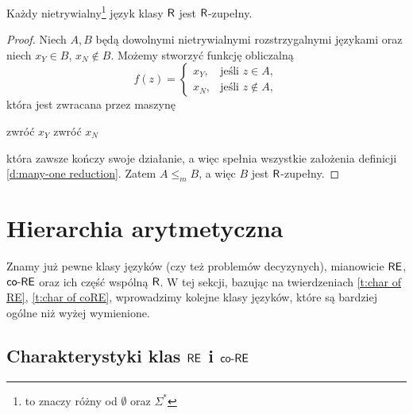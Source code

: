 \begin{theorem}
    Każdy nietrywialny\footnote{to znaczy różny od $\emptyset$ oraz $\Sigma^*$} język klasy $\textsf{R}$ jest $\textsf{R}$-zupełny.
\end{theorem}
\begin{proof}
    Niech $A, B$ będą dowolnymi nietrywialnymi rozstrzygalnymi językami oraz niech $x_Y \in B$, $x_N \notin B$. Możemy stworzyć funkcję obliczalną
    \[ f(z) =
        \begin{cases}
            x_Y, & \text{jeśli } z \in A, \\
            x_N, & \text{jeśli } z \notin A,
        \end{cases}
    \]
    która jest zwracana przez maszynę
    \begin{algorithmic}
            \State zwróć $x_Y$
        \Else
            \State zwróć $x_N$
        \EndIf
    \end{algorithmic}
    która zawsze kończy swoje działanie, a więc spełnia wszystkie założenia definicji \ref{d:many-one reduction}. Zatem $A \leq_m B$, a więc $B$ jest $\textsf{R}$-zupełny.
\end{proof}



\section{Hierarchia arytmetyczna}
Znamy już pewne klasy języków (czy też problemów decyzynych), mianowicie $\textsf{RE}$, $\textsf{co-RE}$ oraz ich część wspólną $\textsf{R}$. W tej sekcji, bazując na twierdzeniach \ref{t:char of RE}, \ref{t:char of coRE}, wprowadzimy kolejne klasy języków, które są bardziej ogólne niż wyżej wymienione.

\subsection{Charakterystyki klas $\textsf{RE}$ i $\textsf{co-RE}$}

